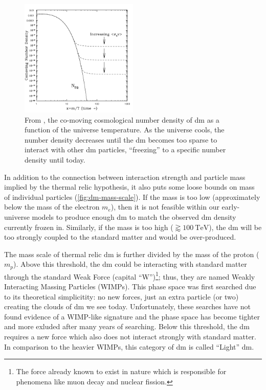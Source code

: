 \begin{figure}
    \centering
    \includegraphics[width=0.5\textwidth]{figures/theory/number-density-at-freeze-out.png}
    \caption{
        From \cite{thermal-freezeout-diagram-1996}, the co-moving cosmological number density of \gls{dm} as a function of the universe
        temperature. As the universe cools, the number density decreases until the \gls{dm}
        becomes too sparse to interact with other \gls{dm} particles, ``freezing'' to a specific
        number density until today.
    }
    \label{fig:number-density}
\end{figure}

In addition to the connection between interaction strength and particle mass implied by the thermal
relic hypothesis, it also puts some loose bounds on mass of individual particles (\cref{fig:dm-mass-scale}).
If the mass is too low (approximately below the mass of the electron $m_e$), then it is not feasible within our early-universe models to produce enough
\gls{dm} to match the observed \gls{dm} density currently frozen in. Similarly, if the mass is too
high ($\gtrapprox 100~\text{TeV}$), the \gls{dm} will be too strongly coupled to the standard matter and would be over-produced.

The mass scale of thermal relic \gls{dm} is further divided by the mass of the proton ($m_p$).
Above this threshold, the \gls{dm} could be interacting with standard matter through the standard
Weak Force (capital ``W'')\footnote{
    The force already known to exist in nature which is responsible for phenomena
    like muon decay and nuclear fission.
}; thus, they are named Weakly Interacting Massing Particles (WIMPs). This phase space was
first searched due to its theoretical simplicitity: no new forces, just an extra particle (or two)
creating the clouds of \gls{dm} we see today. Unfortunately, these searches have not found evidence
of a WIMP-like signature\cite{supercdms-2018,damic-2020,xenon1t-2018} and the phase space has become tighter
and more exluded after many years of searching. Below this threshold, the \gls{dm} requires a new
force which also does not interact strongly with standard matter. In comparison to the heavier WIMPs,
this category of \gls{dm} is called ``Light'' \gls{dm}.

